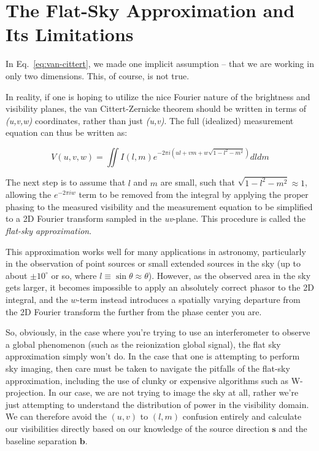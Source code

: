 \chapter{The Flat-Sky Approximation and Its Limitations}
\label{appendix}

In Eq.~\eqref{eq:van-cittert}, we made one implicit assumption -- that we are 
working in only two dimensions. This, of course, is not true. 

In reality, if one is hoping to utilize the nice Fourier nature of the 
brightness and visibility planes, the van Cittert-Zernicke theorem should be 
written in terms of \emph{(u,v,w)} coordinates, rather than just \emph{(u,v)}.  
The full (idealized) measurement equation can thus be written as:

\begin{equation}
    V(u,v,w) = \iint I(l,m) e^{-2\pi i (ul + vm + w\sqrt{1 - l^2 - m^2})} dl dm
    \label{eq:full-measurement}
\end{equation}

The next step is to assume that $l$ and $m$ are small, such that $\sqrt{1 - l^2 
- m^2} \approx 1$, allowing the $e^{-2\pi i w}$ term to be removed from the 
integral by applying the proper phasing to the measured visibility and the 
measurement equation to be simplified to a 2D Fourier transform sampled in the 
\emph{uv}-plane. This procedure is called the \emph{flat-sky approximation}.

This approximation works well for many applications in astronomy, particularly 
in the observation of point sources or small extended sources in the sky (up to 
about $\pm10^\circ$ or so, where $l \equiv \sin\theta \approx \theta$).  
However, as the observed area in the sky gets larger, it becomes impossible to 
apply an absolutely correct phasor to the 2D integral, and the $w$-term instead 
introduces a spatially varying departure from the 2D Fourier transform the 
further from the phase center you are.

So, obviously, in the case where you're trying to use an interferometer to 
observe a global phenomenon (such as the reionization global signal), the flat 
sky approximation simply won't do. In the case that one is attempting to 
perform sky imaging, then care must be taken to navigate the pitfalls of the 
flat-sky approximation, including the use of clunky or expensive algorithms 
such as W-projection. In our case, we are not trying to image the sky at all, 
rather we're just attempting to understand the distribution of power in the 
visibility domain. We can therefore avoid the $(u,v)$ to $(l,m)$ confusion 
entirely and calculate our visibilities directly based on our knowledge of the 
source direction $\mathbf{s}$ and the baseline separation $\mathbf{b}$.
